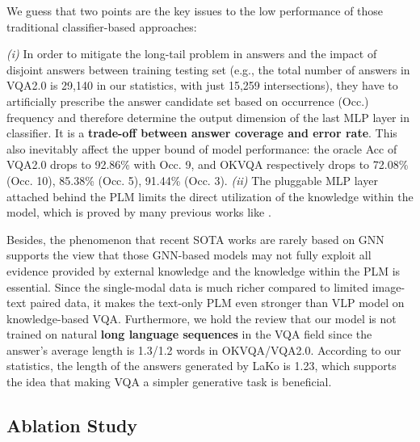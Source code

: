 \documentclass[sigconf]{acmart}
\begin{document}
We guess that two points are the key issues to the low performance of those traditional classifier-based approaches:

\emph{(i)} In order to mitigate the long-tail problem in answers and the impact of disjoint answers between training  testing set (e.g., the total number of answers in VQA2.0 is 29,140 in our statistics, with just 15,259 intersections),
they have to artificially prescribe the answer candidate set based on occurrence (Occ.) frequency and therefore determine the output dimension of the last MLP layer in classifier. It is a \textbf{trade-off between answer coverage and error rate}. 
This also inevitably affect the upper bound of model performance: the oracle Acc of VQA2.0 drops to 92.86\% with Occ. 9, and OKVQA respectively drops to 72.08\% (Occ. 10), 85.38\% (Occ. 5), 91.44\% (Occ. 3).
\emph{(ii)} The pluggable MLP layer attached behind the PLM limits the direct utilization of the knowledge within the model, which is proved by many previous works like \citep{DBLP:conf/acl/GaoFC20}. 


Besides, the phenomenon that recent SOTA works are rarely based on GNN supports the view that those GNN-based models may not fully exploit all evidence provided by external knowledge \citep{DBLP:conf/aaai/BianH0021} and the knowledge within the PLM is essential. Since the single-modal data is much richer compared to limited image-text paired data, it makes the text-only PLM even stronger than VLP model on knowledge-based VQA.
Furthermore, we hold the review that our model is not trained on natural \textbf{long language sequences} in the VQA field since the answer's average length is 1.3/1.2 words in OKVQA/VQA2.0. According to our statistics, the length of the answers generated by LaKo is 1.23, which supports the idea that making VQA a simpler generative task is beneficial. 





\subsection{Ablation Study} \label{sec:ablation}
\end{document}
